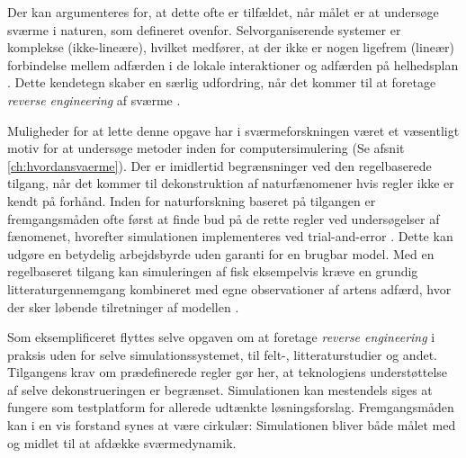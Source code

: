 \par
Der kan argumenteres for, at dette ofte er tilfældet, når målet er at undersøge sværme i naturen, som defineret ovenfor. Selvorganiserende systemer er komplekse (ikke-lineære), hvilket medfører, at der ikke er nogen ligefrem (lineær) forbindelse mellem adfærden i de lokale interaktioner og adfærden på helhedsplan \cite{swarmsarenonlinear}. Dette kendetegn skaber en særlig udfordring, når det kommer til at foretage \textit{reverse engineering} af sværme \cite{swarmsaredifficult}.
\par
Muligheder for at lette denne opgave har i sværmeforskningen været et væsentligt motiv for at undersøge metoder inden for computersimulering (Se afsnit \ref{ch:hvordansvaerme}). Der er imidlertid begrænsninger ved den regelbaserede tilgang, når det kommer til dekonstruktion af naturfænomener hvis regler ikke er kendt på forhånd. Inden for naturforskning baseret på tilgangen er fremgangsmåden ofte først at finde bud på de rette regler ved undersøgelser af fænomenet, hvorefter simulationen implementeres ved trial-and-error \cite{eriksson2010}\cite{cucker2007}. Dette kan udgøre en betydelig arbejdsbyrde uden garanti for en brugbar model. Med en regelbaseret tilgang kan simuleringen af fisk eksempelvis kræve en grundig litteraturgennemgang kombineret med egne observationer af artens adfærd, hvor der sker løbende tilretninger af modellen \cite{RAILSBACK199973}.
\par 
Som eksemplificeret flyttes selve opgaven om at foretage \textit{reverse engineering} i praksis uden for selve simulationssystemet, til felt-, litteraturstudier og andet. Tilgangens krav om prædefinerede regler gør her, at teknologiens understøttelse af selve dekonstrueringen er begrænset. Simulationen kan mestendels siges at fungere som testplatform for allerede udtænkte løsningsforslag. Fremgangsmåden kan i en vis forstand synes at være cirkulær: Simulationen bliver både målet med og midlet til at afdække sværmedynamik.
\par

